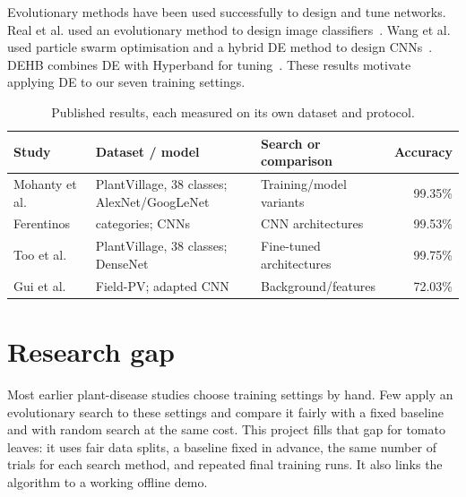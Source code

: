 Evolutionary methods have been used successfully to design and tune networks. Real et al. used an evolutionary method to design image classifiers~\cite{real2019evolution}. Wang et al. used particle swarm optimisation and a hybrid DE method to design CNNs~\cite{wang2018psoarchitecture,wang2018dearchitecture}. DEHB combines DE with Hyperband for tuning~\cite{awad2021dehb}. These results motivate applying DE to our seven training settings.

\begin{table}[htbp]\centering\small
\caption{Published results, each measured on its own dataset and protocol.}
\begin{tabularx}{\textwidth}{@{}>{\raggedright\arraybackslash}p{}>{\raggedright\arraybackslash}X >{\raggedright\arraybackslash}p{}r@{}}\toprule
Study & Dataset / model & Search or comparison & Accuracy\\\midrule
Mohanty et al.~\cite{mohanty2016plant} & PlantVillage, 38 classes; AlexNet/GoogLeNet & Training/model variants & 99.35\%\\
Ferentinos~\cite{ferentinos2018plant} & 58 categories; CNNs & CNN architectures & 99.53\%\\
Too et al.~\cite{too2019plant} & PlantVillage, 38 classes; DenseNet & Fine-tuned architectures & 99.75\%\\
Gui et al.~\cite{gui2021field} & Field-PV; adapted CNN & Background/features & 72.03\%\\\bottomrule
\end{tabularx}
\end{table}

\section{Research gap}
Most earlier plant-disease studies choose training settings by hand. Few apply an evolutionary search to these settings and compare it fairly with a fixed baseline and with random search at the same cost. This project fills that gap for tomato leaves: it uses fair data splits, a baseline fixed in advance, the same number of trials for each search method, and repeated final training runs. It also links the algorithm to a working offline demo.
